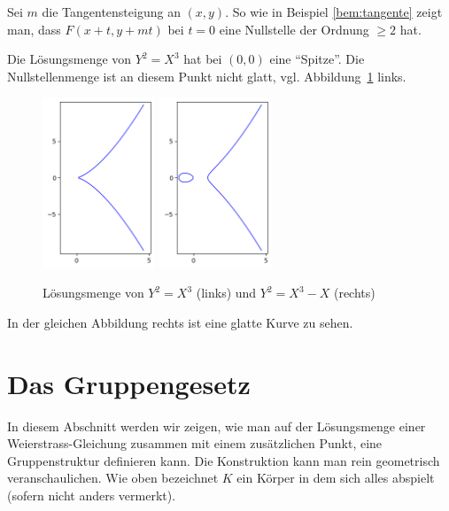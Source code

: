Sei $m$ die Tangentensteigung an $(x,y)$.
So wie in Beispiel \ref{bem:tangente} zeigt man, dass
$F(x+t,y+mt)$ bei $t=0$ eine Nullstelle der Ordnung $\ge 2$ hat. 

\begin{beispiel}
  Die Lösungsmenge von $Y^2=X^3$ hat bei $(0,0)$ eine ``Spitze''.  Die
  Nullstellenmenge ist an diesem Punkt nicht glatt, vgl.
  Abbildung~\ref{fig:cusp} links.

  \begin{figure}
    \centering    
    \caption{Lösungsmenge von $Y^2=X^3$ (links) und $Y^2 = X^3-X$ (rechts)}
    \label{fig:cusp}
    \includegraphics[width=0.3\textwidth]{./plots/cusp.png}
    \includegraphics[width=0.3\textwidth]{./plots/smooth_n_equal_1.png}
  \end{figure}

  In der gleichen Abbildung rechts ist eine glatte Kurve zu sehen.
\end{beispiel}

\section{Das Gruppengesetz}

In diesem Abschnitt werden wir zeigen, wie man auf der Lösungsmenge
einer Weierstrass-Gleichung zusammen mit einem zusätzlichen Punkt,
eine Gruppenstruktur definieren kann. Die Konstruktion kann man rein
geometrisch veranschaulichen. Wie oben bezeichnet $K$ ein Körper in dem
sich alles abspielt (sofern nicht anders vermerkt). 

